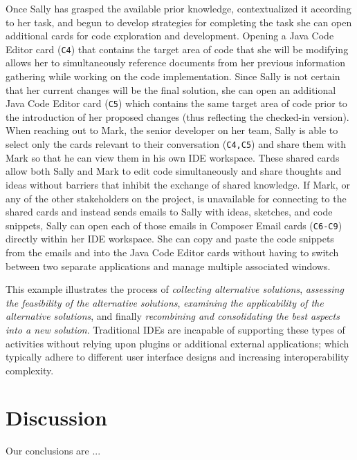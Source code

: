 \documentclass{ppig}
\begin{document}
Once Sally has grasped the available prior knowledge, contextualized it according to her task, and begun to develop strategies for completing the task she can open additional cards for code exploration and development.
Opening a Java Code Editor card (\texttt{C4}) that contains the target area of code that she will be modifying allows her to simultaneously reference documents from her previous information gathering while working on the code implementation.
Since Sally is not certain that her current changes will be the final solution, she can open an additional Java Code Editor card (\texttt{C5}) which contains the same target area of code prior to the introduction of her proposed changes (thus reflecting the checked-in version).
When reaching out to Mark, the senior developer on her team, Sally is able to select only the cards relevant to their conversation (\texttt{C4,C5}) and share them with Mark so that he can view them in his own IDE workspace.
These shared cards allow both Sally and Mark to edit code simultaneously and share thoughts and ideas without barriers that inhibit the exchange of shared knowledge.
If Mark, or any of the other stakeholders on the project, is unavailable for connecting to the shared cards and instead sends emails to Sally with ideas, sketches, and code snippets, Sally can open each of those emails in Composer Email cards (\texttt{C6-C9}) directly within her IDE workspace.
She can copy and paste the code snippets from the emails and into the Java Code Editor cards without having to switch between two separate applications and manage multiple associated windows.

This example illustrates the process of \textit{collecting alternative solutions}, 
\textit{assessing the feasibility of the alternative solutions}, \textit{examining the applicability of the alternative solutions}, and finally \textit{recombining and consolidating the best aspects into a new solution}.
Traditional IDEs are incapable of supporting these types of activities without relying upon plugins or additional external applications; which typically adhere to different user interface designs and increasing interoperability complexity.

\section{Discussion}
Our conclusions are ...


 
\end{document}
